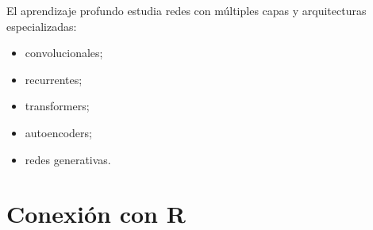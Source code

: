 \documentclass[
  spanish,
  10.5pt,
  letterpaper,
  DIV=11,
  numbers=noendperiod,
  oneside,
  open=any]{scrreprt}
\providecommand{\tightlist}{%
  \setlength{\itemsep}{0pt}\setlength{\parskip}{0pt}}
\theoremstyle{definition}
\theoremstyle{definition}
\theoremstyle{plain}
\theoremstyle{remark}
\begin{document}

El aprendizaje profundo estudia redes con múltiples capas y
arquitecturas especializadas:

\begin{itemize}
\tightlist
\item
  convolucionales;
\item
  recurrentes;
\item
  transformers;
\item
  autoencoders;
\item
  redes generativas.
\end{itemize}

\section*{Conexión con R}\label{conexiuxf3n-con-r-14}

\end{document}
